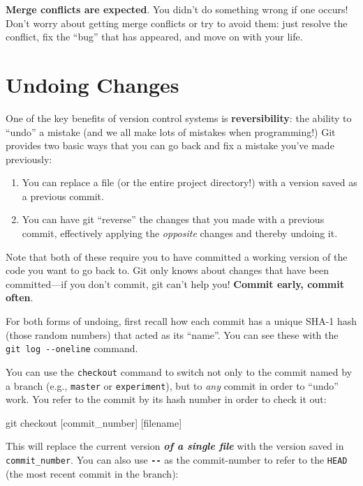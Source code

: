 \documentclass[]{book}
\newenvironment{Shaded}{\begin{snugshade}}{\end{snugshade}}
\newcommand{\FunctionTok}[1]{\textcolor[rgb]{0.00,0.00,0.00}{#1}}
\newcommand{\NormalTok}[1]{#1}
\theoremstyle{definition}
\theoremstyle{definition}
\theoremstyle{remark}
\begin{document}
\textbf{Merge conflicts are expected}. You didn't do something wrong if
one occurs! Don't worry about getting merge conflicts or try to avoid
them: just resolve the conflict, fix the ``bug'' that has appeared, and
move on with your life.

\section{Undoing Changes}\label{undoing-changes}

One of the key benefits of version control systems is
\textbf{reversibility}: the ability to ``undo'' a mistake (and we all
make lots of mistakes when programming!) Git provides two basic ways
that you can go back and fix a mistake you've made previously:

\begin{enumerate}
\def\labelenumi{\arabic{enumi}.}
\item
  You can replace a file (or the entire project directory!) with a
  version saved as a previous commit.
\item
  You can have git ``reverse'' the changes that you made with a previous
  commit, effectively applying the \emph{opposite} changes and thereby
  undoing it.
\end{enumerate}

Note that both of these require you to have committed a working version
of the code you want to go back to. Git only knows about changes that
have been committed---if you don't commit, git can't help you!
\textbf{Commit early, commit often}.

For both forms of undoing, first recall how each commit has a unique
SHA-1 hash (those random numbers) that acted as its ``name''. You can
see these with the \texttt{git\ log\ -\/-oneline} command.

You can use the \texttt{checkout} command to switch not only to the
commit named by a branch (e.g., \texttt{master} or \texttt{experiment}),
but to \emph{any} commit in order to ``undo'' work. You refer to the
commit by its hash number in order to check it out:

\begin{Shaded}
\begin{Highlighting}[]
\FunctionTok{git}\NormalTok{ checkout [commit_number] [filename]}
\end{Highlighting}
\end{Shaded}

This will replace the current version \textbf{\emph{of a single file}}
with the version saved in \texttt{commit\_number}. You can also use
\textbf{\texttt{-\/-}} as the commit-number to refer to the
\texttt{HEAD} (the most recent commit in the branch):
\end{document}
